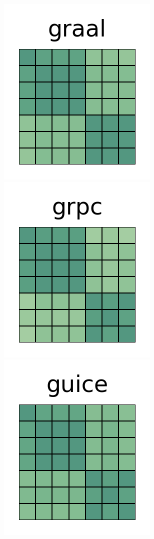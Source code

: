 \documentclass[10pt,conference]{IEEEtran}
\begin{document}
\begin{figure}[htb!]
 \includegraphics[width=\heatmapWidth, keepaspectratio]{correlations-classic/graal-grids.png}
 \includegraphics[width=\heatmapWidth, keepaspectratio]{correlations-classic/grpc-java-grids.png}
 \includegraphics[width=\heatmapWidth, keepaspectratio]{correlations-classic/guice-grids.png}

\end{figure}
\end{document}
